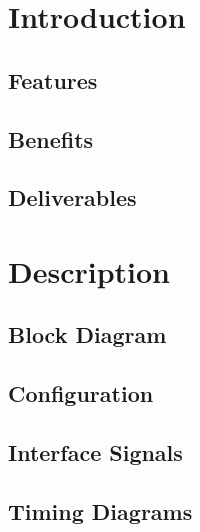 \documentclass{\TEX/ug/ug}
\begin{document}
\maketitle
\cleardoublepage
\tableofcontents
\listoftables
\listoffigures
\cleardoublepage

\section{Introduction}
\label{sec:intro}



\subsection{Features}
\label{sec:feat}


\subsection{Benefits}
\label{sec:benef}


\subsection{Deliverables}
\label{sec:deliv}


\section{Description}
\subsection{Block Diagram}
\label{sec:bdd}


\subsection{Configuration}
\label{sec:ipconfig}


\subsection{Interface Signals}
\label{sec:ifsig}


\ifdefined\TD
\subsection{Timing Diagrams}
\label{sec:td}

\fi
\end{document}
